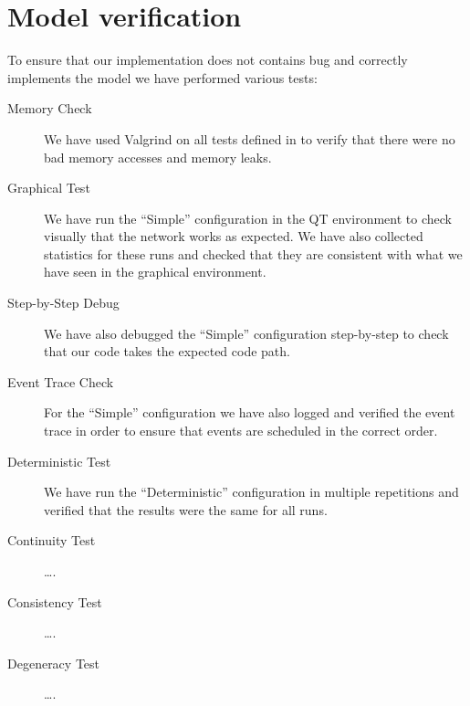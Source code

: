 \section{Model verification}\label{sec:verification}

To ensure that our implementation does not contains bug and correctly implements
the model we have performed various tests:
\begin{description}
	\item[Memory Check] We have used Valgrind on all tests defined in
		 to verify that there were no bad memory
		accesses and memory leaks.
	\item[Graphical Test] We have run the ``Simple'' configuration in the
		\omnetpp{} QT environment to check visually that the network
		works as expected. We have also collected statistics for these
		runs and checked that they are consistent with what we have seen
		in the graphical environment.
	\item[Step-by-Step Debug] We have also debugged the ``Simple''
		configuration step-by-step to check that our code takes the
		expected code path.
	\item[Event Trace Check] For the ``Simple'' configuration we have also
		logged and verified the event trace in order to ensure that
		events are scheduled in the correct order.
	\item[Deterministic Test] We have run the ``Deterministic''
		configuration in multiple repetitions and verified that the
		results were the same for all runs.
	\item[Continuity Test] \ldots.
	\item[Consistency Test] \ldots.
	\item[Degeneracy Test] \ldots.
\end{description}
